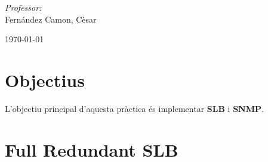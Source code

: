 \documentclass[10pt]{article}
\begin{document}
\begin{center}
\begin{minipage}{0.46\textwidth}
\begin{flushleft}
\end{flushleft}                                                                     %
\end{minipage}      
\begin{minipage}{0.52\textwidth}        
\vspace{-0.6cm}                                         %
\begin{flushright} \large                                                           %
\emph{Professor:} \\                                                                 %
Fernández Camon, Cèsar                                                    %
\end{flushright}                                                                    %
\end{minipage}  
\vspace*{1cm}
    

\begin{center}                                                                                  
{\large \today}                                                                 %
            \end{center}                                                                        
\end{center}                                                                        
                                                                                    
\newpage                                                                        

\tableofcontents
\listoffigures 

\newpage
\section{Objectius}
L'objectiu principal d'aquesta pràctica és implementar \textbf{SLB} i \textbf{SNMP}.
\section{Full Redundant SLB}
\end{document}
